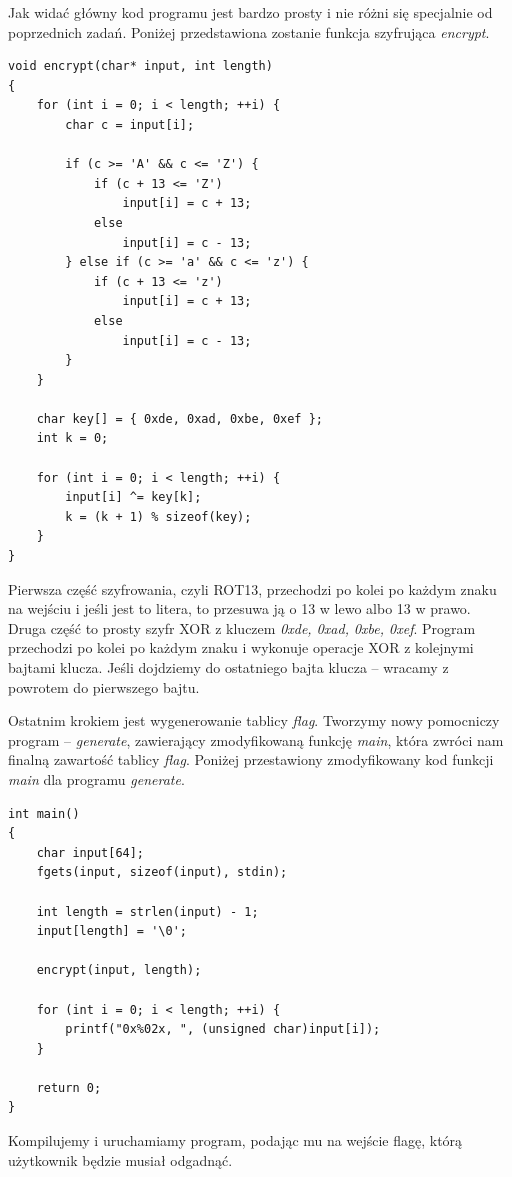 \documentclass[language=polish,type=eng]{aghmodern}
\begin{document}
Jak widać główny kod programu jest bardzo prosty i nie różni się specjalnie od poprzednich zadań.
Poniżej przedstawiona zostanie funkcja szyfrująca \emph{encrypt}.

\begin{verbatim}
void encrypt(char* input, int length)
{
    for (int i = 0; i < length; ++i) {
        char c = input[i];

        if (c >= 'A' && c <= 'Z') {
            if (c + 13 <= 'Z')
                input[i] = c + 13;
            else
                input[i] = c - 13;
        } else if (c >= 'a' && c <= 'z') {
            if (c + 13 <= 'z')
                input[i] = c + 13;
            else
                input[i] = c - 13;
        }
    }

    char key[] = { 0xde, 0xad, 0xbe, 0xef };
    int k = 0;

    for (int i = 0; i < length; ++i) {
        input[i] ^= key[k];
        k = (k + 1) % sizeof(key);
    }
}
\end{verbatim}

Pierwsza część szyfrowania, czyli ROT13, przechodzi po kolei po każdym znaku na wejściu i jeśli jest to litera,
to przesuwa ją o 13 w lewo albo 13 w prawo. Druga część to prosty szyfr XOR z kluczem \emph{0xde, 0xad, 0xbe, 0xef}.
Program przechodzi po kolei po każdym znaku i wykonuje operacje XOR z kolejnymi bajtami klucza. Jeśli dojdziemy
do ostatniego bajta klucza -- wracamy z powrotem do pierwszego bajtu.

Ostatnim krokiem jest wygenerowanie tablicy \emph{flag}. Tworzymy nowy pomocniczy program
-- \emph{generate}, zawierający zmodyfikowaną funkcję \emph{main},
która zwróci nam finalną zawartość tablicy \emph{flag}.
Poniżej przestawiony zmodyfikowany kod funkcji \emph{main} dla programu \emph{generate}.

\begin{verbatim}
int main()
{
    char input[64];
    fgets(input, sizeof(input), stdin);

    int length = strlen(input) - 1;
    input[length] = '\0';

    encrypt(input, length);

    for (int i = 0; i < length; ++i) {
        printf("0x%02x, ", (unsigned char)input[i]);
    }

    return 0;
}
\end{verbatim}

Kompilujemy i uruchamiamy program, podając mu na wejście flagę, którą użytkownik będzie musiał odgadnąć.
\end{document}
